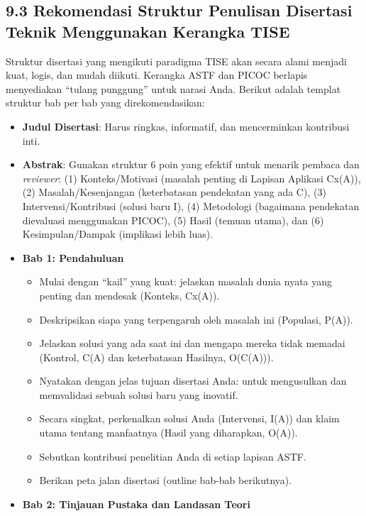 \documentclass[
  letterpaper,
  DIV=11,
  numbers=noendperiod]{scrreprt}
\providecommand{\tightlist}{%
  \setlength{\itemsep}{0pt}\setlength{\parskip}{0pt}}
\begin{document}
\subsection{\texorpdfstring{\textbf{9.3 Rekomendasi Struktur Penulisan
Disertasi Teknik Menggunakan Kerangka
TISE}}{9.3 Rekomendasi Struktur Penulisan Disertasi Teknik Menggunakan Kerangka TISE}}\label{rekomendasi-struktur-penulisan-disertasi-teknik-menggunakan-kerangka-tise}

Struktur disertasi yang mengikuti paradigma TISE akan secara alami
menjadi kuat, logis, dan mudah diikuti. Kerangka ASTF dan PICOC berlapis
menyediakan ``tulang punggung'' untuk narasi Anda. Berikut adalah
templat struktur bab per bab yang direkomendasikan:

\begin{itemize}
\tightlist
\item
  \textbf{Judul Disertasi}: Harus ringkas, informatif, dan mencerminkan
  kontribusi inti.
\item
  \textbf{Abstrak}: Gunakan struktur 6 poin yang efektif untuk menarik
  pembaca dan \emph{reviewer}: (1) Konteks/Motivasi (masalah penting di
  Lapisan Aplikasi Cx(A)), (2) Masalah/Kesenjangan (keterbatasan
  pendekatan yang ada C), (3) Intervensi/Kontribusi (solusi baru I), (4)
  Metodologi (bagaimana pendekatan dievaluasi menggunakan PICOC), (5)
  Hasil (temuan utama), dan (6) Kesimpulan/Dampak (implikasi lebih
  luas).
\item
  \textbf{Bab 1: Pendahuluan}

  \begin{itemize}
  \tightlist
  \item
    Mulai dengan ``kail'' yang kuat: jelaskan masalah dunia nyata yang
    penting dan mendesak (Konteks, Cx(A)).
  \item
    Deskripsikan siapa yang terpengaruh oleh masalah ini (Populasi,
    P(A)).
  \item
    Jelaskan solusi yang ada saat ini dan mengapa mereka tidak memadai
    (Kontrol, C(A) dan keterbatasan Hasilnya, O(C(A))).
  \item
    Nyatakan dengan jelas tujuan disertasi Anda: untuk mengusulkan dan
    memvalidasi sebuah solusi baru yang inovatif.
  \item
    Secara singkat, perkenalkan solusi Anda (Intervensi, I(A)) dan klaim
    utama tentang manfaatnya (Hasil yang diharapkan, O(A)).
  \item
    Sebutkan kontribusi penelitian Anda di setiap lapisan ASTF.
  \item
    Berikan peta jalan disertasi (outline bab-bab berikutnya).
  \end{itemize}
\item
  \textbf{Bab 2: Tinjauan Pustaka dan Landasan Teori}


\end{itemize}
\end{document}
